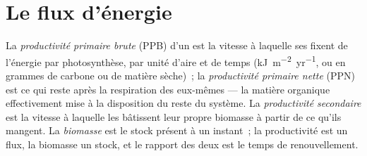 \section{Le flux d'énergie}

\begin{definition}[Productivité]\label{def:b1:ecosystem-organization:productivity}
La \emph{productivité primaire brute} (PPB) d'un  est la
vitesse à laquelle ses  fixent de l'énergie par
photosynthèse, par unité d'aire et de temps
(\unit{kJ.m^{-2}.yr^{-1}}, ou en grammes de carbone ou de matière
sèche)~; la \emph{productivité primaire nette} (PPN) est ce qui reste
après la respiration des  eux-mêmes --- la matière organique
effectivement mise à la disposition du reste du système. La
\emph{productivité secondaire} est la vitesse à laquelle les
 bâtissent leur propre biomasse à partir de ce qu'ils
mangent. La \emph{biomasse} est le stock présent à un instant~; la
productivité est un flux, la biomasse un stock, et le rapport des deux
est le temps de renouvellement.
\end{definition}

